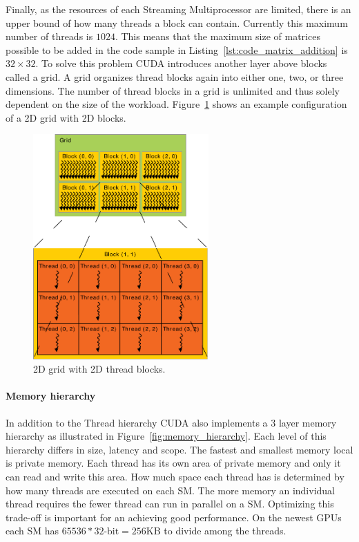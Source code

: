 \documentclass[a4paper,11pt]{kth-mag}
\begin{document}
Finally, as the resources of each Streaming Multiprocessor are limited, there is an upper bound of how many threads a block can contain. Currently this maximum number of threads is $1024$. This means that the maximum size of matrices possible to be added in the code sample in Listing~\ref{lst:code_matrix_addition} is $32\times32$. To solve this problem CUDA introduces another layer above blocks called a grid. A grid organizes thread blocks again into either one, two, or three dimensions. The number of thread blocks in a grid is unlimited and thus solely dependent on the size of the workload. Figure~\ref{fig:grid_blocks} shows an example configuration of a 2D grid with 2D blocks.

\begin{figure}[!htbp]
  \centering
  \includegraphics[width=0.6\textwidth]{img/grid_blocks.pdf}
  \caption{2D grid with 2D thread blocks.}
  \label{fig:grid_blocks}
\end{figure}

\paragraph{Memory hierarchy}

In addition to the Thread hierarchy CUDA also implements a 3 layer memory hierarchy as illustrated in Figure~\ref{fig:memory_hierarchy}. Each level of this hierarchy differs in size, latency and scope. The fastest and smallest memory local is private memory. Each thread has its own area of private memory and only it can read and write this area. How much space each thread has is determined by how many threads are executed on each SM. The more memory an individual thread requires the fewer thread can run in parallel on a SM. Optimizing this trade-off is important for an achieving good performance. On the newest GPUs each SM has $65536 * 32\text{-bit} = 256\text{KB}$ to divide among the threads.
\end{document}
